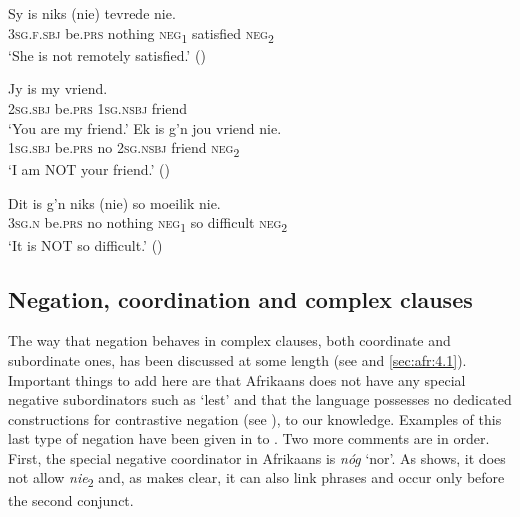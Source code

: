 \documentclass[output=paper,colorlinks,citecolor=brown]{langscibook}
\begin{document}
\ea\label{ex:afr:45a}
    \gll Sy is niks (nie) tevrede nie. \\ 
         \textsc{3sg.f.sbj} be.\textsc{prs} nothing \textsc{neg}\textsubscript{1} satisfied \textsc{neg}\textsubscript{2} \\
    \glt ‘She is not remotely satisfied.’ (\citealt[11]{BiberauerCyrino2009}) 
\z 

\ea\label{ex:afr:45b}
    \begin{xlist}
    \label{ex:afr:45b.A}
        \gll Jy is my vriend. \\
         2\textsc{sg.sbj} be.\textsc{prs} \textsc{1sg.nsbj} friend \\
    \glt ‘You are my friend.’ 
    \label{ex:afr:45b.B}
        \gll Ek is g’n jou vriend nie. \\
         \textsc{1sg.sbj} be.\textsc{prs} no \textsc{2sg.nsbj} friend  \textsc{neg}\textsubscript{2}\\
    \glt ‘I am NOT your friend.’ (\citealt[9]{BiberauerCyrino2009})
    \end{xlist} 
\z
        
\ea\label{ex:afr:45c}
    \gll Dit is g’n niks (nie) so moeilik nie. \\
         3\textsc{sg.n} be.\textsc{prs} no nothing \textsc{neg}\textsubscript{1} so difficult \textsc{neg}\textsubscript{2} \\
    \glt ‘It is NOT so difficult.’ (\citealt[12]{BiberauerCyrino2009})
\z


\subsection{Negation, coordination and complex clauses}

The way that negation behaves in complex clauses, both coordinate and subordinate ones, has been discussed at some length (see  and \ref{sec:afr:4.1}). Important things to add here are that Afrikaans does not have any special negative subordinators such as ‘lest’ and that the language possesses no dedicated constructions for contrastive negation (see \citealt{Silvennoinen2019}), to our knowledge. Examples of this last type of negation have been given in  to . Two more comments are in order. First, the special negative coordinator in Afrikaans is \textit{nóg} ‘nor’. As  shows, it does not allow \textit{nie}\textsubscript{2} and, as  makes clear, it can also link phrases and occur only before the second conjunct.
\end{document}
